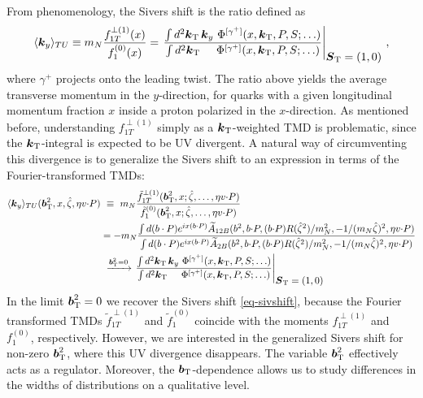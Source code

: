 From phenomenology, the Sivers shift is the ratio defined as
\begin{align}
	\langle \vect{k}_y \rangle_{TU} \equiv \mN \frac{f_{1T}^{\perp(1)}(x)}{f_1^{(0)}(x)} = 
	\left. \frac{ \int d^2 \vprp{\kei}\, \vect{\kei}_y  \ \Phi^{[\gamma^+]}(x,\vprp{\kei},P,S;\ldots) }{ \int d^2 \vprp{\kei}  \phantom{\vect{\kei}_y}\ \Phi^{[\gamma^+]}(x,\vprp{\kei},P,S;\ldots) } \right|_{\displaystyle \vprp{S}=(1,0) }\, , \label{eq-sivshift}
\end{align}
where $\gamma^+$ projects onto the leading twist.
The ratio above yields the average transverse momentum
in the $y$-direction, for quarks with a given longitudinal momentum fraction $x$ inside a proton polarized in the $x$-direction. As mentioned before, understanding $f_{1T}^{\perp(1)}$ simply as a $\boldsymbol{k}_{\mathrm T}$-weighted TMD is problematic, since the $\boldsymbol{k}_{\mathrm T}$-integral is expected to be UV divergent. 
A natural way of circumventing this divergence is to generalize the Sivers shift to an expression in terms of the Fourier-transformed TMDs:
\begingroup\small
\begin{align}
    \langle \vect{k}_y \rangle_{TU}(\vprp{\bvec}^2,x,\zetahat,\eta v \tcdot P) 
	&\ \equiv\ \mN \frac{\tilde f_{1T}^{\perp(1)}(\vprp{\bvec}^2,x;\zetahat,\ldots,\eta v \tcdot P)}{\tilde f_1^{(0)}(\vprp{\bvec}^2,x;\zetahat,\ldots,\eta v \tcdot P)}  \\
 &=-m_{N} \frac{\int d(b\cdot P)e^{ix(b\cdot P)} \tAmp_{12B}(\bvec^2,\bvec \tcdot P,(\bvec \tcdot P) R(\zetahat^2)/\mN^2,-1/(\mN\zetahat)^2,\eta v \tcdot P)}{\int d(b\cdot P)e^{ix(b\cdot P)}\tAmp_{2B}(\bvec^2,\bvec \tcdot P,(\bvec \tcdot P) R(\zetahat^2)/\mN^2,-1/(\mN\zetahat)^2,\eta v \tcdot P)} \\
 &\ \xrightarrow{\vprp{\bvec}^2 = 0} 
		\left. \frac{  \int d^2 \vprp{\kei}\, \vect{\kei}_y  \ \Phi^{[\gamma^+]}(x,\vprp{\kei},P,S;\ldots) }
		{  \int d^2 \vprp{\kei}  \phantom{\vect{\kei}_y}\ \Phi^{[\gamma^+]}(x,\vprp{\kei},P,S;\ldots) } \right|_{\displaystyle \vprp{S}=(1,0) } 
	\label{eq-genSivShift}
\end{align}
\endgroup
In the limit $\boldsymbol{b}_{\mathrm T}^2=0$ we recover the Sivers shift \eqref{eq-sivshift}, because the Fourier transformed TMDs $\tilde f_{1T}^{\perp(1)}$ and $\tilde f_1^{(0)}$ coincide with the moments $f_{1T}^{\perp(1)}$ and $f_1^{(0)}$, respectively. However, we are interested in the generalized Sivers shift for non-zero $\boldsymbol{b}_{\mathrm T}^2$, where this UV divergence disappears. The variable $\boldsymbol{b}_{\mathrm T}^2$ effectively acts as a regulator. Moreover, the $\boldsymbol{b}_{\mathrm T}$-dependence allows us to study differences in the widths of distributions on a qualitative level.

